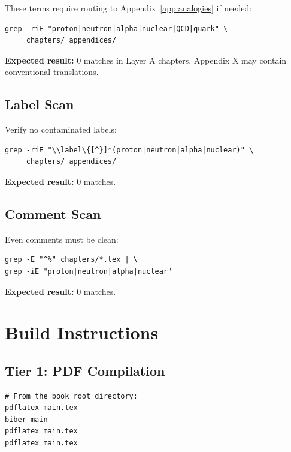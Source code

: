 These terms require routing to Appendix~\ref{app:analogies} if needed:

\begin{verbatim}
grep -riE "proton|neutron|alpha|nuclear|QCD|quark" \
     chapters/ appendices/
\end{verbatim}

\textbf{Expected result:} 0 matches in Layer A chapters. Appendix X may
contain conventional translations.

\subsection{Label Scan}

Verify no contaminated labels:

\begin{verbatim}
grep -riE "\\label\{[^}]*(proton|neutron|alpha|nuclear)" \
     chapters/ appendices/
\end{verbatim}

\textbf{Expected result:} 0 matches.

\subsection{Comment Scan}

Even comments must be clean:

\begin{verbatim}
grep -E "^%" chapters/*.tex | \
grep -iE "proton|neutron|alpha|nuclear"
\end{verbatim}

\textbf{Expected result:} 0 matches.

\section{Build Instructions}
\label{sec:repro:build}

\subsection{Tier 1: PDF Compilation}

\begin{verbatim}
# From the book root directory:
pdflatex main.tex
biber main
pdflatex main.tex
pdflatex main.tex
\end{verbatim}


